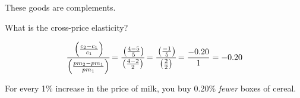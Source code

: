 \documentclass[12 pt]{exam}
\begin{document}
\begin{questions}
\begin{solution}
These goods are complements.
\end{solution}

\question What is the cross-price elasticity? 

\begin{solution}

\begin{equation*}
\displaystyle \cfrac{\left(\frac{c_2-c_1}{c_1}\right)}{\left(\frac{pm_2-pm_1}{pm_1}\right)} = \cfrac{\left(\frac{4-5}{5}\right)}{\left(\frac{4-2}{2}\right)}=\cfrac{\left(\frac{-1}{5}\right)}{\left(\frac{2}{2}\right)} = \frac{-0.20}{1} = -0.20
\end{equation*}

For every 1\% increase in the price of milk, you buy 0.20\% \emph{fewer} boxes of cereal.

\end{solution}

\end{questions}
\end{document}
